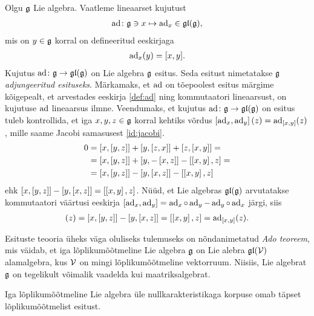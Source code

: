 \begin{naide}\label{naide:adjoint-repr}
    Olgu $\mathfrak{g}$ Lie algebra. Vaatleme lineaarset kujutust
    \begin{align*}
        \operatorname{ad} \colon \mathfrak{g} \ni x \mapsto \operatorname{ad}_x \in \mathfrak{gl}(\mathfrak{g}),
    \end{align*}
    mis on $y \in \mathfrak{g}$ korral on defineeritud eeskirjaga
    \begin{align}\label{def:ad}
        \operatorname{ad}_x(y) = [x, y].
    \end{align}
    Kujutus $\operatorname{ad} \colon \mathfrak{g} \to \mathfrak{gl}(\mathfrak{g})$ on Lie algebra $\mathfrak{g}$ esitus. Seda esitust
    nimetatakse $\mathfrak{g}$ \emph{adjungeeritud esituseks}. Märkamaks, et $\operatorname{ad}$ on
    tõepoolest esitus märgime kõigepealt, et arvestades eeskirja
    \eqref{def:ad} ning kommutaatori lineaarsust, on kujutuse $\operatorname{ad}$
    lineaarsus ilmne. Veendumaks, et kujutus $\operatorname{ad} \colon \mathfrak{g} \to \mathfrak{gl}(\mathfrak{g})$ on
    esitus tuleb kontrollida, et iga $x, y, z \in \mathfrak{g}$ korral kehtiks võrdus
    $\left[ \operatorname{ad}_x, \operatorname{ad}_y \right](z) = \operatorname{ad}_{[x, y]}(z)$, mille saame Jacobi
    samasusest \eqref{id:jacobi}.
    \begin{align*}
        0 &= \left[ x, \left[ y, z \right] \right] + \left[ y, \left[ z, x \right] \right] +
             \left[ z, \left[ x, y \right] \right] = \\
          &= \left[ x, \left[ y, z \right] \right] + \left[ y, -\left[ x, z \right] \right] -
             \left[ \left[ x, y \right], z \right] = \\
          &= \left[ x, \left[ y, z \right] \right] - \left[ y, \left[ x, z \right] \right] -
             \left[ \left[ x, y \right], z \right]
    \end{align*}
    ehk $\left[ x, \left[ y, z \right] \right] - \left[ y, \left[ x, z \right] \right] = \left[ \left[ x, y \right], z \right]$.
    Nüüd, et Lie algebras $\mathfrak{gl}(\mathfrak{g})$ arvutatakse kommutaatori
    väärtusi eeskirja
    $[\operatorname{ad}_x, \operatorname{ad}_y] = \operatorname{ad}_x \circ \operatorname{ad}_y - \operatorname{ad}_y \circ \operatorname{ad}_x$ järgi, siis
    \begin{align*}
        [\ad_x, \ad_y](z) = \brac{x}{\brac{y}{z}} - \brac{y}{\brac{x}{z}} =
        \brac{\brac{x}{y}}{z} = \ad_{\brac{x}{y}}(z).
    \end{align*}
\end{naide}

Esituste teooria üheks väga oluliseks tulemuseks on nõndanimetatud
\emph{Ado teoreem}, mis väidab, et iga lõplikumõõtmeline Lie algebra $\mathfrak{g}$
on Lie alebra $\mathfrak{gl}(\mathcal{V})$ alamalgebra, kus $\mathcal{V}$ on mingi lõplikumõõtmeline
vektorruum. Niisiis, Lie algebrat $\mathfrak{g}$ on tegelikult võimalik vaadelda kui
maatriksalgebrat.\cite{hall2003lie}

\begin{thm}[Ado, 1935]
    Iga lõplikumõõtmeline Lie algebra üle nullkarakteristikaga korpuse omab
    täpset lõplikumõõtmelist esitust.
\end{thm}

